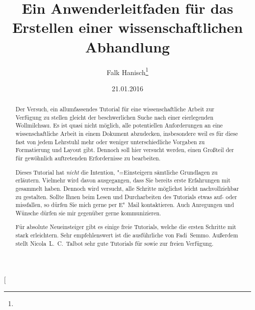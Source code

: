 \documentclass[%
  english,ngerman,%
  cdgeometry=no,DIV=12,automark,%
]{tudscrartcl}
\begin{document}
\date{21.01.2016}
\author{Falk Hanisch\thanks{\noexpand\scriptsize\noexpand\Email{\tudscrmail}}}
\title{%
  Ein Anwenderleitfaden für das Erstellen einer wissenschaftlichen Abhandlung%
}
\makeatletter
\begingroup%
  \def\and{, }%
  \let\thanks\@gobble%
  \let\footnote\@gobble%
\endgroup%
\makeatother
\StartTutorial[%
  \begin{abstract}\noindent
  Der Versuch, ein allumfassendes Tutorial für eine wissenschaftliche Arbeit 
  zur Verfügung zu stellen gleicht der beschwerlichen Suche nach einer 
  eierlegenden Wollmilchsau. Es ist quasi nicht möglich, alle potentiellen 
  Anforderungen an eine wissenschaftliche Arbeit in einem Dokument abzudecken, 
  insbesondere weil es für diese fast von jedem Lehrstuhl mehr oder weniger 
  unterschiedliche Vorgaben zu Formatierung und Layout gibt. Dennoch soll hier 
  versucht werden, einen Großteil der für gewöhnlich auftretenden Erfordernisse 
  zu bearbeiten.
  
  Dieses Tutorial hat \emph{nicht} die Intention, "=Einsteigern 
  sämtliche Grundlagen zu erläutern. Vielmehr wird davon ausgegangen, dass Sie 
  bereits erste Erfahrungen mit  gesammelt haben. Dennoch wird 
  versucht, alle Schritte möglichst leicht nachvollziehbar zu gestalten. Sollte 
  Ihnen beim Lesen und Durcharbeiten des Tutorials etwas auf- oder missfallen, 
  so dürfen Sie mich gerne per E"~Mail kontaktieren. Auch Anregungen und 
  Wünsche dürfen sie mir gegenüber gerne kommunizieren.
  
  Für absolute Neueinsteiger gibt es einige freie Tutorials, welche die ersten 
  Schritte mit  stark erleichtern. Sehr empfehlenswert ist die 
  ausführliche  
  von Fadi~Semmo. Außerdem stellt Nicola~L.~C.~Talbot sehr gute Tutorials für 
  \cite{talbot2012} sowie 
  \cite{talbot2013} zur freien Verfügung.
  

\end{abstract}
\end{document}
